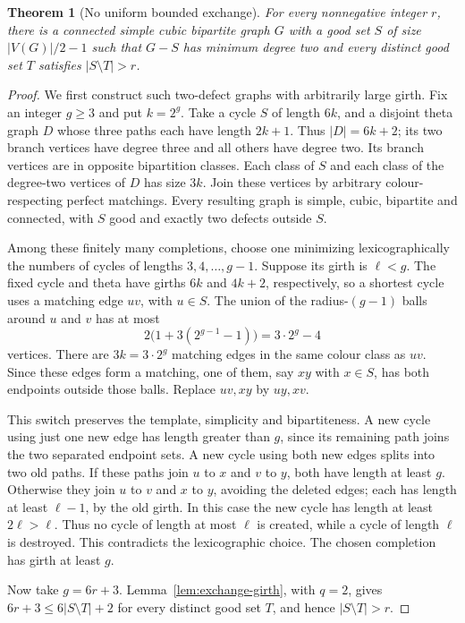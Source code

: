 \documentclass[11pt]{article}
\newtheorem{theorem}{Theorem}[section]
\begin{document}
\begin{theorem}[No uniform bounded exchange]\label{thm:unbounded-exchange}
For every nonnegative integer $r$, there is a connected simple
cubic bipartite graph $G$ with a good set $S$ of size
$|V(G)|/2-1$ such that $G-S$ has minimum degree two and every
distinct good set $T$ satisfies $|S\setminus T|>r$.
\end{theorem}
\begin{proof}
We first construct such two-defect graphs with arbitrarily
large girth. Fix an integer $g\geq3$ and put $k=2^g$.
Take a cycle $S$ of length $6k$, and a disjoint theta graph $D$
whose three paths each have length $2k+1$. Thus $|D|=6k+2$;
its two branch vertices have degree three and all others have
degree two. Its branch vertices are in opposite bipartition
classes. Each class of $S$ and each class of the degree-two
vertices of $D$ has size $3k$. Join these vertices by arbitrary
colour-respecting perfect matchings. Every resulting graph is
simple, cubic, bipartite and connected, with $S$ good and exactly
two defects outside $S$.

Among these finitely many completions, choose one minimizing
lexicographically the numbers of cycles of lengths
$3,4,\ldots,g-1$. Suppose its girth is $\ell<g$. The fixed
cycle and theta have girths $6k$ and $4k+2$, respectively, so a
shortest cycle uses a matching edge $uv$, with $u\in S$.
The union of the radius-$(g-1)$ balls around $u$ and $v$ has
at most
\[
 2\bigl(1+3(2^{g-1}-1)\bigr)=3\cdot2^g-4
\]
vertices. There are $3k=3\cdot2^g$ matching edges in the same
colour class as $uv$. Since these edges form a matching, one
of them, say $xy$ with $x\in S$, has both endpoints outside
those balls. Replace $uv,xy$ by $uy,xv$.

This switch preserves the template, simplicity and bipartiteness.
A new cycle using just one new edge has length greater than
$g$, since its remaining path joins the two separated endpoint
sets. A new cycle using both new edges splits into two old
paths. If these paths join $u$ to $x$ and $v$ to $y$, both
have length at least $g$. Otherwise they join $u$ to $v$ and
$x$ to $y$, avoiding the deleted edges; each has length at
least $\ell-1$, by the old girth. In this case the new cycle
has length at least $2\ell>\ell$.
Thus no cycle of length at most $\ell$ is created, while a
cycle of length $\ell$ is destroyed. This contradicts the
lexicographic choice. The chosen completion has girth at least $g$.

Now take $g=6r+3$. Lemma~\ref{lem:exchange-girth}, with $q=2$,
gives $6r+3\leq6|S\setminus T|+2$ for every distinct good set
$T$, and hence $|S\setminus T|>r$.
\end{proof}
\end{document}
